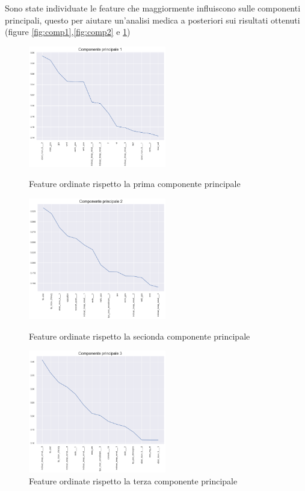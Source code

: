 Sono state individuate le feature che maggiormente influiscono sulle componenti principali, questo per aiutare un'analisi medica a posteriori sui risultati ottenuti (figure \ref{fig:comp1},\ref{fig:comp2} e \ref{fig:comp3})

\begin{figure}  
	\begin{minipage}{0.45\textwidth} 
		\centering
		\includegraphics[width=6cm]{capitolo3/comp1.png}
		\caption{Feature ordinate rispetto la prima componente principale}
		\label{fig:comp1}  
	\end{minipage}    
	\hspace{\fill}  %
	\begin{minipage}{0.45\textwidth} 
		\centering
		\includegraphics[width=6cm]{capitolo3/comp2.png}
		\caption{Feature ordinate rispetto la secionda componente principale}
		\label{fig:comp2}  
	\end{minipage}    
	
	\vspace{0.75cm}
	\centering
	\includegraphics[width=6cm]{capitolo3/comp3.png}
	\caption{Feature ordinate rispetto la terza componente principale}
	\label{fig:comp3} 
  
\end{figure}



